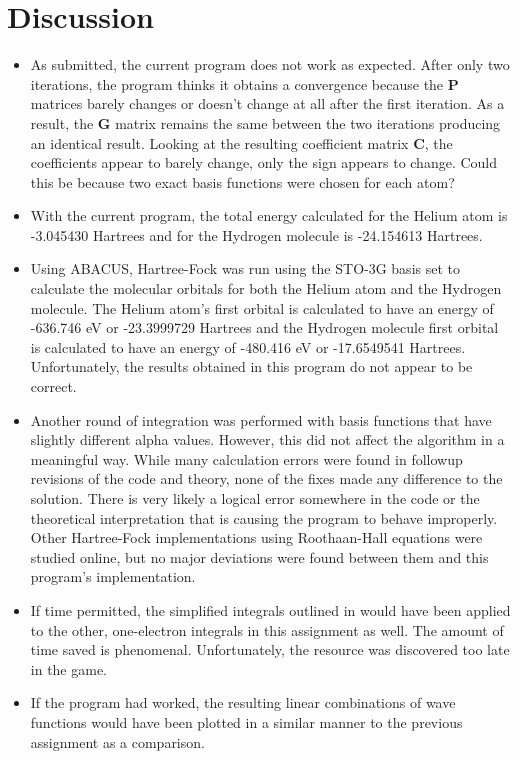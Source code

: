 \documentclass[10pt, oneside, letterpaper]{article}
\begin{document}
\newpage
\section{Discussion}

\begin{itemize}
    \item As submitted, the current program does not work as expected. After only two iterations, the program thinks it obtains a convergence because the $\bm{P}$ matrices barely changes or doesn't change at all after the first iteration. As a result, the $\bm{G}$ matrix remains the same between the two iterations producing an identical result. Looking at the resulting coefficient matrix $\bm{C}$, the coefficients appear to barely change, only the sign appears to change. Could this be because two exact basis functions were chosen for each atom?
    \item With the current program, the total energy calculated for the Helium atom is -3.045430 Hartrees and for the Hydrogen molecule is -24.154613 Hartrees.
    \item Using ABACUS, Hartree-Fock was run using the STO-3G basis set to calculate the molecular orbitals for both the Helium atom and the Hydrogen molecule. The Helium atom's first orbital is calculated to have an energy of -636.746 eV or -23.3999729 Hartrees and the Hydrogen molecule first orbital is calculated to have an energy of -480.416 eV or -17.6549541 Hartrees. Unfortunately, the results obtained in this program do not appear to be correct.
    \item Another round of integration was performed with basis functions that have slightly different alpha values. However, this did not affect the algorithm in a meaningful way. While many calculation errors were found in followup revisions of the code and theory, none of the fixes made any difference to the solution. There is very likely a logical error somewhere in the code or the theoretical interpretation that is causing the program to behave improperly. Other Hartree-Fock implementations using Roothaan-Hall equations were studied online, but no major deviations were found between them and this program's implementation.
    \item If time permitted, the simplified integrals outlined in \cite{molecular-integrals-over-gaussian-basis-functions} would have been applied to the other, one-electron integrals in this assignment as well. The amount of time saved is phenomenal. Unfortunately, the resource was discovered too late in the game.
    \item If the program had worked, the resulting linear combinations of wave functions would have been plotted in a similar manner to the previous assignment as a comparison.
\end{itemize}
\end{document}
